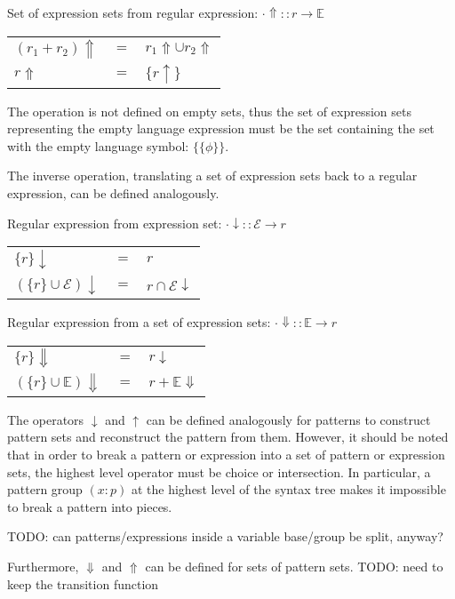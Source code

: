 Set of expression sets from regular expression: $\cdot\Uparrow :: r \to \mathbb{E}$

\begin{tabular}{lll}
   $(r_1 + r_2)\Uparrow$	& $=$	& $r_1\Uparrow \cup r_2\Uparrow$	\\
   $r\Uparrow$			& $=$	& $\{r\uparrow\}$			\\
\end{tabular}

The operation is not defined on empty sets, thus the set of expression sets
representing the empty language expression must be the set containing the set
with the empty language symbol: $\{\{\phi\}\}$.

The inverse operation, translating a set of expression sets back to a regular
expression, can be defined analogously.

Regular expression from expression set: $\cdot\downarrow :: \mathcal{E} \to r$

\begin{tabular}{lll}
   $\{r\}\downarrow$			& $=$	& $r$					\\
   $(\{r\} \cup \mathcal{E})\downarrow$	& $=$	& $r \cap \mathcal{E}\downarrow$	\\
\end{tabular}

Regular expression from a set of expression sets: $\cdot\Downarrow :: \mathbb{E} \to r$

\begin{tabular}{lll}
   $\{r\}\Downarrow$			& $=$	& $r\downarrow$			\\
   $(\{r\} \cup \mathbb{E})\Downarrow$	& $=$	& $r + \mathbb{E}\Downarrow$	\\
\end{tabular}

The operators $\downarrow$ and $\uparrow$ can be defined analogously for
patterns to construct pattern sets and reconstruct the pattern from them.
However, it should be noted that in order to break a pattern or expression
into a set of pattern or expression sets, the highest level operator must be
choice or intersection. In particular, a pattern group $(x:p)$ at the highest
level of the syntax tree makes it impossible to break a pattern into pieces.

TODO: can patterns/expressions inside a variable base/group be split, anyway?

Furthermore, $\Downarrow$ and $\Uparrow$ can be defined for sets of pattern
sets. TODO: need to keep the transition function


